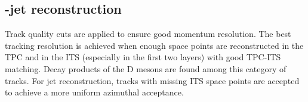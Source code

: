 \documentclass[a4paper]{jpconf}
\begin{document}
\subsection{\Dzero-jet reconstruction}
Track quality cuts are applied to ensure good momentum resolution. 
The best tracking resolution is achieved when enough space points are reconstructed in the TPC and in the ITS (especially in the first two layers)
with good TPC-ITS matching.
Decay products of the D mesons are found among this category of tracks.
For jet reconstruction, tracks with missing ITS space points are accepted to achieve a more uniform azimuthal acceptance.
\end{document}
